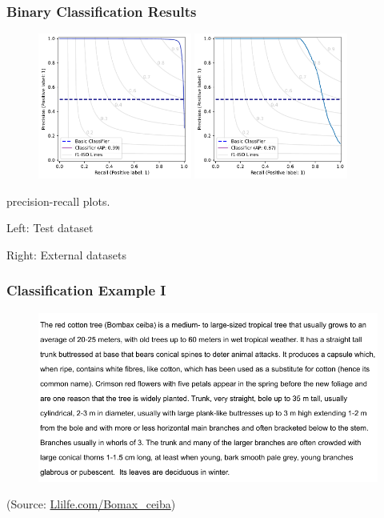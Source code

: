 \documentclass{beamer}
\begin{document}
\begin{frame}
\frametitle{Binary Classification Results}
\begin{figure} [htbp]
    \centering
    \includegraphics[width=0.45\textwidth]{figures/precision_recall_plot.pdf}
      \hfill
    \includegraphics[width=0.45\textwidth]{figures/precision_recall_plot_extern.pdf}
\end{figure}
precision-recall plots.

Left: Test dataset

Right: External datasets
\end{frame}

\begin{frame}
\frametitle{Classification Example I}
\begin{figure} [htbp]
    \centering
    \includegraphics[width=\textwidth]{figures/web_crawler_example_sents_2.pdf}
\end{figure}
(Source: \href{http://www.llifle.com/Encyclopedia/TREES/Family/Bombacaceae/31994/Bombax_ceiba}{Llilfe.com/Bomax\_ceiba})
\end{frame}
\end{document}
